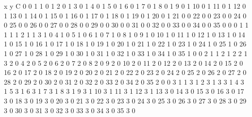x y C
0 0 1
1 0 1
2 0 1
3 0 1
4 0 1
5 0 1
6 0 1
7 0 1
8 0 1
9 0 1
10 0 1
11 0 1
12 0 1
13 0 1
14 0 1
15 0 1
16 0 1
17 0 1
18 0 1
19 0 1
20 0 1
21 0 0
22 0 0
23 0 0
24 0 0
25 0 0
26 0 0
27 0 0
28 0 0
29 0 0
30 0 0
31 0 0
32 0 0
33 0 0
34 0 0
35 0 0
0 1 1
1 1 1
2 1 1
3 1 0
4 1 0
5 1 0
6 1 0
7 1 0
8 1 0
9 1 0
10 1 0
11 1 0
12 1 0
13 1 0
14 1 0
15 1 0
16 1 0
17 1 0
18 1 0
19 1 0
20 1 0
21 1 0
22 1 0
23 1 0
24 1 0
25 1 0
26 1 0
27 1 0
28 1 0
29 1 0
30 1 0
31 1 0
32 1 0
33 1 0
34 1 0
35 1 0
0 2 1
1 2 1
2 2 1
3 2 0
4 2 0
5 2 0
6 2 0
7 2 0
8 2 0
9 2 0
10 2 0
11 2 0
12 2 0
13 2 0
14 2 0
15 2 0
16 2 0
17 2 0
18 2 0
19 2 0
20 2 0
21 2 0
22 2 0
23 2 0
24 2 0
25 2 0
26 2 0
27 2 0
28 2 0
29 2 0
30 2 0
31 2 0
32 2 0
33 2 0
34 2 0
35 2 0
0 3 1
1 3 1
2 3 1
3 3 1
4 3 1
5 3 1
6 3 1
7 3 1
8 3 1
9 3 1
10 3 1
11 3 1
12 3 1
13 3 0
14 3 0
15 3 0
16 3 0
17 3 0
18 3 0
19 3 0
20 3 0
21 3 0
22 3 0
23 3 0
24 3 0
25 3 0
26 3 0
27 3 0
28 3 0
29 3 0
30 3 0
31 3 0
32 3 0
33 3 0
34 3 0
35 3 0
